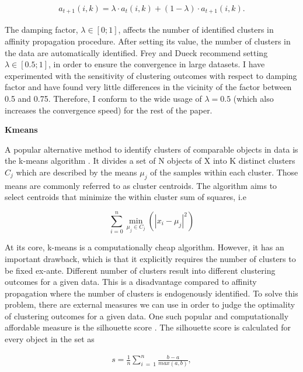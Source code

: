 \documentclass[a4paper,12pt]{article}
\newcommand{\citeyearonly}[1]{\citeyearpar{#1}}
\begin{document}
\begin{align}
    a_{t+1}\left(i,k\right) = \lambda \cdot a_t\left(i,k\right) + (1-\lambda) \cdot a_{t+1}\left(i,k\right).
\end{align}


The damping factor,  $\lambda\in[0;1]$, affects the number of identified clusters in affinity propagation procedure. After setting its value, the number of clusters in the data are automatically identified. Frey and Dueck \citeyearonly{freyDueck07} recommend setting  $\lambda\in[0.5;1]$, in order to ensure the convergence in large datasets. I have experimented with the sensitivity of clustering outcomes with respect to damping factor and have found very little differences in the vicinity of the factor between 0.5 and 0.75. Therefore, I conform to the wide usage of $\lambda=0.5$ (which also increases the convergence speed) for the rest of the paper.

\textbf{Kmeans}

A popular alternative method to identify clusters of comparable objects in data is the k-means algorithm \citep{lloyd82}. It divides a set of N objects of X into K distinct clusters $C_j$  which are described by the means $\mu_j$ of the samples within each cluster. Those means are commonly referred to as cluster centroids. The algorithm aims to select centroids that minimize the within cluster sum of squares, i.e

$$\sum_{i=0}^{n}\min_{\mu_j\in C_j}\left(\left.\left|x_i-\mu_j\right|^2\right.\right)$$

At its core, k-means is a computationally cheap algorithm. However, it has an important drawback, which is that it explicitly requires the number of clusters to be fixed ex-ante. Different number of clusters result into different clustering outcomes for a given data. This is a disadvantage compared to affinity propagation where the number of clusters is endogenously identified. To solve this problem, there are external measures we can use in order to judge the optimality of clustering outcomes for a given data. One such popular and computationally affordable measure is the silhouette score \citep{rousseeuw1987silhouettes}. The silhouette score is calculated for every object in the set as

\begin{align}\label{eq:silhouetteCalculation}
    s=\frac{1}{n}\sum_{i\ =\ 1}^{n}{\frac{b-a}{max\left(a,b\right)}},
\end{align}
\end{document}
